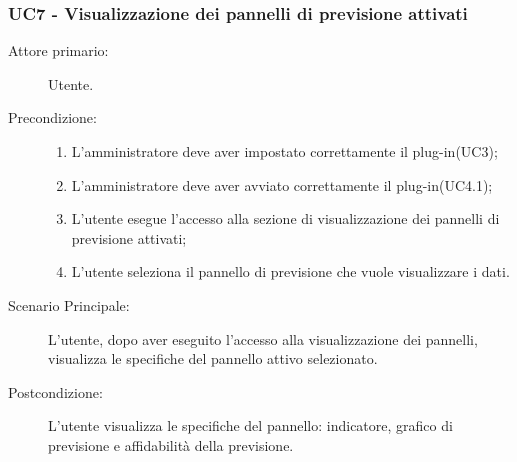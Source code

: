 \subsubsection{UC7 - Visualizzazione dei pannelli di previsione attivati}
\label{sssec:uc7}
\begin{description}
	\item[Attore primario:] Utente.
	\item[Precondizione:]
	\begin{enumerate}
		\item L'amministratore deve aver impostato correttamente il plug-in(UC3);
		\item L'amministratore deve aver avviato correttamente il plug-in(UC4.1);
		\item L'utente esegue l'accesso alla sezione di visualizzazione dei pannelli di previsione attivati;
		\item L'utente seleziona il pannello di previsione che vuole visualizzare i dati.
	\end{enumerate}
	\item[Scenario Principale:] L'utente, dopo aver eseguito l'accesso alla visualizzazione dei pannelli, visualizza le specifiche del pannello attivo selezionato.
	\item[Postcondizione:] L'utente visualizza le specifiche del pannello: indicatore, grafico di previsione e affidabilità della previsione.
\end{description}